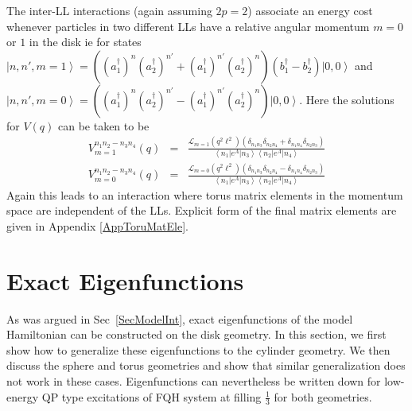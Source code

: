 \documentclass[prb,aps,epsfig,longbibliography,twocolumn]{revtex4-1}
\begin{document}
The inter-LL interactions (again assuming $2p=2$) associate an energy cost whenever particles in two different LLs have a relative angular momentum $m=0$ or $1$ in the disk ie for states $\left|n,n',m=1 \right\rangle = ( (a_1^\dagger)^{n} (a_2^{\dagger})^{n'} + (a_1^\dagger)^{n'} (a_2^{\dagger})^{n}) ( b_1^\dagger - b_2^\dagger)\left | 0,0\right\rangle$ and $\left|n,n',m=0\right\rangle= ( (a_1^\dagger)^{n} (a_2^{\dagger})^{n'} - (a_1^\dagger)^{n'} (a_2^{\dagger})^{n}) \left| 0,0\right\rangle$. Here the solutions for $V(q)$ can be taken to be
\begin{align}
V^{n_1n_2-n_3n_4}_{m=1}(q) &=& \frac{\mathcal{L}_{m=1}(q^2\ell^2)(\delta_{n_1n_3}\delta_{n_2 n_4} + \delta_{n_1n_4}\delta_{n_2n_3})}{\left\langle n_1 |e^A|n_3 \right\rangle \left\langle n_2 |e^A|n_4 \right\rangle} \nonumber\\
V^{n_1n_2-n_3n_4}_{m=0}(q) &=& \frac{\mathcal{L}_{m=0}(q^2\ell^2)(\delta_{n_1n_3}\delta_{n_2 n_4} - \delta_{n_1n_4}\delta_{n_2n_3})}{\left\langle n_1 |e^A|n_3 \right\rangle \left\langle n_2 |e^A|n_4 \right\rangle} \nonumber
\end{align}
Again this leads to an interaction where torus matrix elements in the momentum space are independent of the LLs. Explicit form of the final matrix elements are given in Appendix \ref{AppToruMatEle}.

\section{Exact Eigenfunctions} \label{ExactEig}
As was argued in Sec~\ref{SecModelInt}, exact eigenfunctions of the model Hamiltonian can be constructed on the disk geometry.  In this section, we first show how to generalize these eigenfunctions to the cylinder geometry. We then discuss the sphere and torus geometries and show that similar generalization does not work in these cases. Eigenfunctions can nevertheless be written down for low-energy QP type excitations of FQH system at filling $\frac{1}{3}$ for both geometries.
\end{document}
